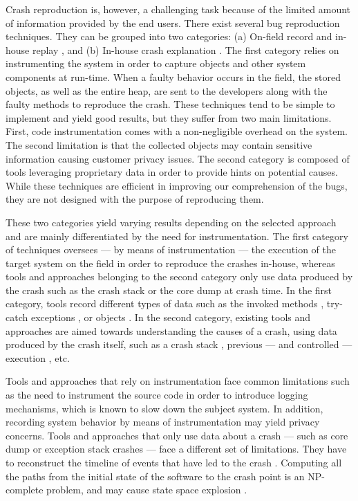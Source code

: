 Crash reproduction is, however, a challenging task because of the limited amount of information  provided by the end users.
There exist several bug reproduction techniques. They can be grouped into two categories: (a) On-field record and in-house replay \cite{Narayanasamy2005,Artzi2008,Jaygarl}, and (b) In-house crash explanation \cite{Manevich2004,chandra2009snugglebug}.
The first category relies on instrumenting the system in order to capture objects and other system components at run-time.
When a faulty behavior occurs in the field, the stored objects, as well as the entire heap, are sent to the developers along with the faulty methods to reproduce the crash.
These techniques tend to be simple to implement and yield good results, but they suffer from two main limitations.
First, code instrumentation comes with a non-negligible overhead on the system.
The second limitation is that the collected objects may contain sensitive information causing customer privacy issues.
The second category is composed of tools leveraging proprietary data in order to provide hints on potential causes. While these techniques are efficient in improving our comprehension of the bugs, they are not designed with the purpose of reproducing them.

These two categories yield varying results depending on the selected approach and are mainly differentiated by the need for instrumentation.
The first category of techniques oversees --- by means of instrumentation --- the execution of the target system on the field in order to reproduce the crashes in-house, whereas tools and approaches belonging to the second category only use data produced by the crash such as the crash stack or the core dump at crash time.
In the first category, tools record different types of data such as the invoked methods \cite{Narayanasamy2005}, try-catch exceptions \cite{Rossler2013}, or objects \cite{Jaygarl}.
In the second category, existing tools and approaches are aimed towards understanding the causes of a crash, using data produced by the crash itself, such as a crash stack \cite{Chen2013a}, previous --- and controlled --- execution \cite{Zuddas2014}, etc.

Tools and approaches that rely on instrumentation face common limitations such as the need to instrument the source code in order to introduce logging mechanisms\cite{Narayanasamy2005,Jaygarl,Artzi2008}, which is known to slow down the subject system.
In addition,  recording system behavior by means of instrumentation may yield privacy concerns.
Tools and approaches that only use data about a crash --- such as core dump or exception stack crashes --- face a different set of limitations. They have to reconstruct the timeline of events that have led to the crash \cite{Chen2013a,Nayrolles2015}.
Computing all the paths from the initial state of the software to the crash point is an NP-complete problem, and may cause state space explosion \cite{Chen2013a,Clause2007}.


